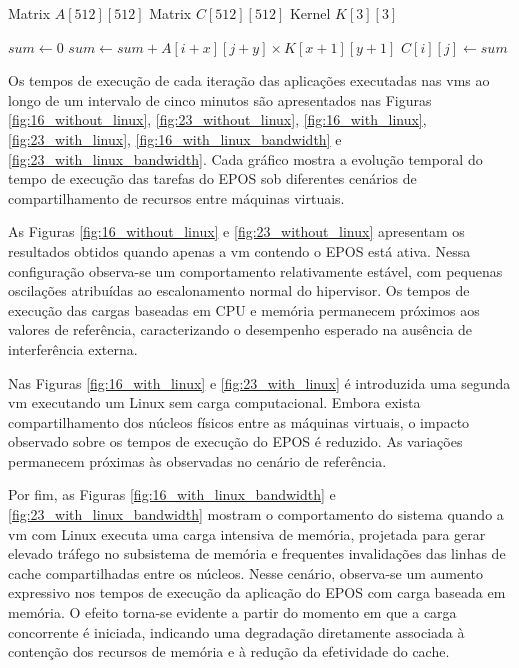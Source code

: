 \begin{algorithm}[H]
\caption{Convolução Bidimensional}
\label{alg:convolution_memory_hungry}
\begin{algorithmic}[1]
    \State Matrix $A[512][512]$
    \State Matrix $C[512][512]$
    \State Kernel $K[3][3]$

                \State $sum \gets 0$
                        \State $sum \gets sum + A[i+x][j+y] \times K[x+1][y+1]$
                    \EndFor
                \EndFor
                \State $C[i][j] \gets sum$
            \EndFor
        \EndFor
    \EndFor
\EndProcedure
\end{algorithmic}
\end{algorithm}

Os tempos de execução de cada iteração das aplicações executadas nas \glspl{vm} ao longo de um intervalo de cinco minutos são
apresentados nas Figuras \ref{fig:16_without_linux}, \ref{fig:23_without_linux}, \ref{fig:16_with_linux}, \ref{fig:23_with_linux},
\ref{fig:16_with_linux_bandwidth} e \ref{fig:23_with_linux_bandwidth}. Cada gráfico mostra a evolução temporal do tempo de execução
das tarefas do EPOS sob diferentes cenários de compartilhamento de recursos entre máquinas virtuais.

As Figuras \ref{fig:16_without_linux} e \ref{fig:23_without_linux} apresentam os resultados obtidos quando apenas a \gls{vm}
contendo o EPOS está ativa. Nessa configuração observa-se um comportamento relativamente estável, com pequenas oscilações atribuídas
ao escalonamento normal do hipervisor. Os tempos de execução das cargas baseadas em CPU e memória permanecem próximos aos valores de
referência, caracterizando o desempenho esperado na ausência de interferência externa.

Nas Figuras \ref{fig:16_with_linux} e \ref{fig:23_with_linux} é introduzida uma segunda \gls{vm} executando um Linux sem
carga computacional. Embora exista compartilhamento dos núcleos físicos entre as máquinas virtuais, o impacto observado sobre os
tempos de execução do EPOS é reduzido. As variações permanecem próximas às observadas no cenário de referência.

Por fim, as Figuras \ref{fig:16_with_linux_bandwidth} e \ref{fig:23_with_linux_bandwidth} mostram o comportamento do sistema quando a
\gls{vm} com Linux executa uma carga intensiva de memória, projetada para gerar elevado tráfego no subsistema de memória e frequentes
invalidações das linhas de cache compartilhadas entre os núcleos. Nesse cenário, observa-se um aumento expressivo nos tempos de
execução da aplicação do EPOS com carga baseada em memória. O efeito torna-se evidente a partir do momento em que a carga
concorrente é iniciada, indicando uma degradação diretamente associada à contenção dos recursos de memória e à redução da
efetividade do cache.

